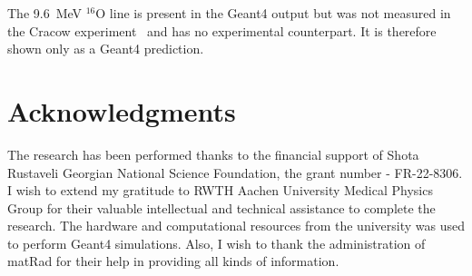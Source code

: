 \documentclass[a4paper]{article}
\begin{document}
The 9.6~MeV $^{16}$O line is present in the Geant4 output but was not measured in the Cracow experiment~\cite{kelleter2017} and has no experimental counterpart. It is therefore shown only as a Geant4 prediction.

\section*{Acknowledgments}

The research has been performed thanks to the financial support of Shota Rustaveli Georgian National Science Foundation, the grant number - FR-22-8306.
I wish to extend my gratitude to RWTH Aachen University Medical Physics Group for their valuable intellectual and technical assistance to complete the research.
The hardware and computational resources from the university was used to perform Geant4 simulations.
Also, I wish to thank the administration of matRad for their help in providing all kinds of information.
\end{document}
